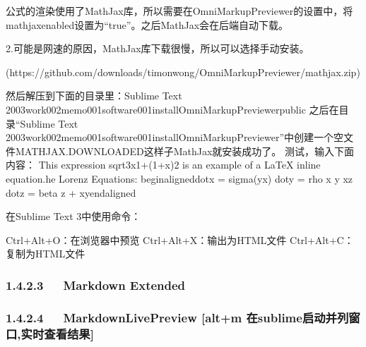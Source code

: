 \documentclass[letterpaper,12pt,english]{sphinxmanual}
\begin{document}
\begin{sphinxVerbatim}[commandchars=\\\{\}]
公式的渲染使用了MathJax库，所以需要在OmniMarkupPreviewer的设置中，将\PYGZdq{}mathjax\PYGZus{}enabled\PYGZdq{}设置为“true”。之后MathJax会在后端自动下载。
\end{sphinxVerbatim}

2.可能是网速的原因，MathJax库下载很慢，所以可以选择手动安装。

\begin{sphinxVerbatim}[commandchars=\\\{\}]
[下载MathJax](https://github.com/downloads/timonwong/OmniMarkupPreviewer/mathjax.zip)

    然后解压到下面的目录里：Sublime Text 2\PYGZbs{}\PYGZbs{}003work\PYGZbs{}002memo\PYGZbs{}001software\PYGZbs{}001install\PYGZbs{}OmniMarkupPreviewer\PYGZbs{}public
    之后在目录“Sublime Text 2\PYGZbs{}\PYGZbs{}003work\PYGZbs{}002memo\PYGZbs{}001software\PYGZbs{}001install\PYGZbs{}OmniMarkupPreviewer”中创建一个空文件MATHJAX.DOWNLOADED这样子MathJax就安装成功了。
    测试，输入下面内容：
    This expression
    \PYGZdl{}\PYGZbs{}sqrt\PYGZob{}3x\PYGZhy{}1\PYGZcb{}+(1+x)\PYGZca{}2\PYGZdl{} is an example of a \PYGZdl{}\PYGZbs{}LaTeX\PYGZdl{} inline equation.he Lorenz Equations:
    \PYGZdl{}\PYGZdl{}\PYGZbs{}begin\PYGZob{}aligned\PYGZcb{}\PYGZbs{}dot\PYGZob{}x\PYGZcb{} \PYGZam{} = \PYGZbs{}sigma(y\PYGZhy{}x) \PYGZbs{}\PYGZbs{}\PYGZbs{}dot\PYGZob{}y\PYGZcb{} \PYGZam{} = \PYGZbs{}rho x \PYGZhy{} y \PYGZhy{} xz \PYGZbs{}\PYGZbs{}\PYGZbs{}dot\PYGZob{}z\PYGZcb{} \PYGZam{} = \PYGZhy{}\PYGZbs{}beta z + xy\PYGZbs{}end\PYGZob{}aligned\PYGZcb{}\PYGZdl{}\PYGZdl{}
\end{sphinxVerbatim}

在Sublime Text 3中使用命令：

\begin{sphinxVerbatim}[commandchars=\\\{\}]
Ctrl+Alt+O：在浏览器中预览
Ctrl+Alt+X：输出为HTML文件
Ctrl+Alt+C：复制为HTML文件
\end{sphinxVerbatim}


\subsubsection{1.4.2.3   Markdown Extended}
\label{\detokenize{001software/001install/sublime:markdown-extended}}

\subsubsection{1.4.2.4   MarkdownLivePreview {[}alt+m 在sublime启动并列窗口,实时查看结果{]}}
\label{\detokenize{001software/001install/sublime:markdownlivepreview-alt-m-sublime}}
\end{document}
